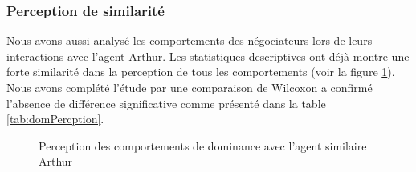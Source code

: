 	\subsubsection{Perception de similarité}
	Nous avons aussi analysé les comportements des négociateurs lors de leurs interactions avec l'agent Arthur. Les statistiques descriptives ont déjà montre une forte similarité dans la perception de tous les comportements (voir la figure \ref{fig:sim}). Nous avons complété l'étude par une comparaison de Wilcoxon a confirmé l'absence de différence significative comme présenté dans la table \ref{tab:domPercption}.  
	\begin{figure}[!tb]
		\centering
		
		\caption{Perception des comportements de dominance avec l'agent similaire Arthur}
		\label{fig:sim}
	\end{figure}
	
